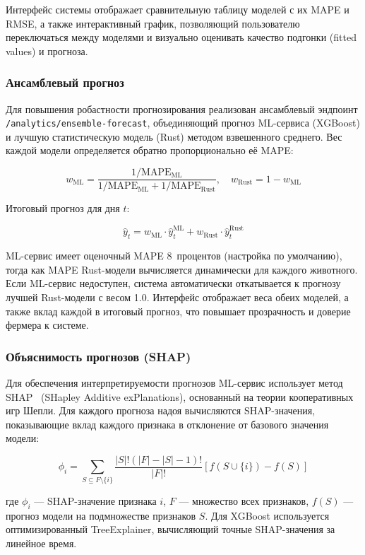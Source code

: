 Интерфейс системы отображает сравнительную таблицу моделей с их MAPE и RMSE, а также интерактивный график, позволяющий пользователю переключаться между моделями и визуально оценивать качество подгонки (fitted values) и прогноза.

\subsubsection{Ансамблевый прогноз}

Для повышения робастности прогнозирования реализован ансамблевый эндпоинт \texttt{/analytics/ensemble-forecast}, объединяющий прогноз ML-сервиса (XGBoost) и лучшую статистическую модель (Rust) методом взвешенного среднего. Вес каждой модели определяется обратно пропорционально её MAPE:

$$w_{\text{ML}} = \frac{1/\text{MAPE}_{\text{ML}}}{1/\text{MAPE}_{\text{ML}} + 1/\text{MAPE}_{\text{Rust}}}, \quad w_{\text{Rust}} = 1 - w_{\text{ML}}$$

Итоговый прогноз для дня $t$:

$$\hat{y}_t = w_{\text{ML}} \cdot \hat{y}_t^{\text{ML}} + w_{\text{Rust}} \cdot \hat{y}_t^{\text{Rust}}$$

ML-сервис имеет оценочный MAPE 8~процентов (настройка по умолчанию), тогда как MAPE Rust-модели вычисляется динамически для каждого животного. Если ML-сервис недоступен, система автоматически откатывается к прогнозу лучшей Rust-модели с весом 1.0. Интерфейс отображает веса обеих моделей, а также вклад каждой в итоговый прогноз, что повышает прозрачность и доверие фермера к системе.

\subsubsection{Объяснимость прогнозов (SHAP)}

Для обеспечения интерпретируемости прогнозов ML-сервис использует метод SHAP~\cite{SHAP} (SHapley Additive exPlanations), основанный на теории кооперативных игр Шепли. Для каждого прогноза надоя вычисляются SHAP-значения, показывающие вклад каждого признака в отклонение от базового значения модели:

$$\phi_i = \sum_{S \subseteq F \setminus \{i\}} \frac{|S|!(|F|-|S|-1)!}{|F|!} \left[ f(S \cup \{i\}) - f(S) \right]$$

где $\phi_i$ --- SHAP-значение признака $i$, $F$ --- множество всех признаков, $f(S)$ --- прогноз модели на подмножестве признаков $S$. Для XGBoost используется оптимизированный TreeExplainer, вычисляющий точные SHAP-значения за линейное время.

